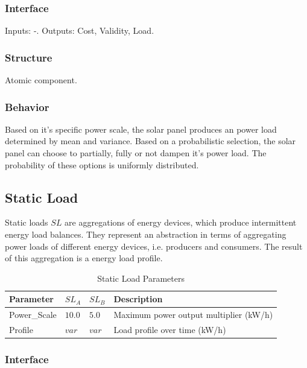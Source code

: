 \subsubsection{Interface}

Inputs: -. Outputs: Cost, Validity, Load.

\subsubsection{Structure}

Atomic component.

\subsubsection{Behavior}

Based on it's specific power scale, the solar panel produces an power load determined by mean and variance. Based on a probabilistic selection, the solar panel can choose to partially, fully or not dampen it's power load. The probability of these options is uniformly distributed.

\subsection{Static Load}
Static loads $SL$ are aggregations of energy devices, which produce intermittent energy load balances. They represent an abstraction in terms of aggregating power loads of different energy devices, i.e. producers and consumers. The result of this aggregation is a energy load profile.

\begin{table}[h]
	\renewcommand{\arraystretch}{1.3}
	\caption{Static Load Parameters}
	\centering
	\begin{tabular}{llll}
		\hline
		\textbf{Parameter}              & \textbf{$SL_{A}$}  & \textbf{$SL_{B}$}   & \textbf{Description} \\ \hline
		Power\_Scale                   	  & $10.0$ & $5.0$ & Maximum power output multiplier (kW/h) \\
		Profile                       	  	   & $var$ & $var$ & Load profile over time  (kW/h)\\ \hline
	\end{tabular}
\end{table}


\subsubsection{Interface}

